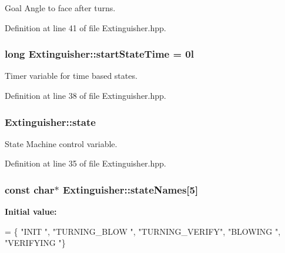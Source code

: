 Goal Angle to face after turns. 



Definition at line 41 of file Extinguisher.\-hpp.

\hypertarget{classExtinguisher_a75020779b6ba6fcd9ac11148a378d441}{
\subsubsection[{start\-State\-Time}]{\setlength{\rightskip}{0pt plus 5cm}long Extinguisher\-::start\-State\-Time = 0l\hspace{0.3cm}{\ttfamily [private]}}}\label{classExtinguisher_a75020779b6ba6fcd9ac11148a378d441}


Timer variable for time based states. 



Definition at line 38 of file Extinguisher.\-hpp.

\hypertarget{classExtinguisher_aa67c13dc091e5dc2c054d53f7fcae69b}{
\subsubsection[{state}]{ Extinguisher\-::state\hspace{0.3cm}{\ttfamily [private]}}}\label{classExtinguisher_aa67c13dc091e5dc2c054d53f7fcae69b}


State Machine control variable. 



Definition at line 35 of file Extinguisher.\-hpp.

\hypertarget{classExtinguisher_a91cd54af9125620a68939ccdc5796c66}{
\subsubsection[{state\-Names}]{\setlength{\rightskip}{0pt plus 5cm}const char$\ast$ Extinguisher\-::state\-Names\mbox{[}5\mbox{]}\hspace{0.3cm}{\ttfamily [private]}}}\label{classExtinguisher_a91cd54af9125620a68939ccdc5796c66}
{\bfseries Initial value\-:}
\begin{DoxyCode}
= \{
      \textcolor{stringliteral}{"INIT          "},
      \textcolor{stringliteral}{"TURNING\_BLOW  "},
      \textcolor{stringliteral}{"TURNING\_VERIFY"},
      \textcolor{stringliteral}{"BLOWING       "},
      \textcolor{stringliteral}{"VERIFYING     "}\}
\end{DoxyCode}


